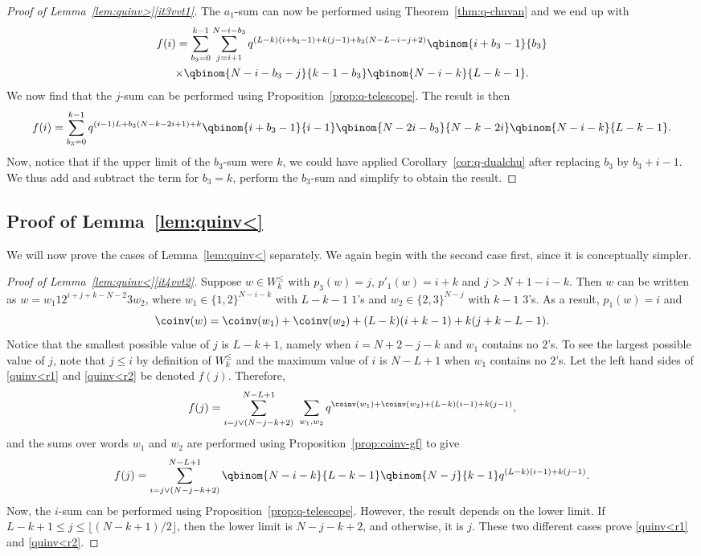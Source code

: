 \begin{proof}[Proof of Lemma~\ref{lem:quinv>}\ref{it3vvt1}]
The $a_1$-sum can now be performed using Theorem~\ref{thm:q-chuvan} and we end up with
\begin{multline*}
f(i) = \sum_{b_3 = 0}^{k-1}   \sum_{j=i+1}^{N-i-b_3} q^{(L-k)(i+b_3-1) + k(j-1) + b_3(N-L-i-j+2)} \qbinom{i+b_3-1}{b_3} \\
\times \qbinom {N-i-b_3-j}{k-1-b_3}  \qbinom {N-i-k}{L-k-1} .
\end{multline*}
We now find that the $j$-sum can be performed using Proposition~\ref{prop:q-telescope}.  The result is then
\[
f(i) = \sum_{b_3 = 0}^{k-1}  q^{(i-1)L + b_3(N-k-2i+1) + k} 
\qbinom{i+b_3-1}{i-1} \qbinom {N-2i-b_3}{N-k-2i} 
\qbinom {N-i-k}{L-k-1} .
\]
Now, notice that if the upper limit of the $b_3$-sum were $k$, we could have applied
Corollary~\ref{cor:q-dualchu} after replacing $b_3$ by $b_3+i-1$.  We thus add and subtract 
the term for $b_3 = k$, perform the $b_3$-sum and simplify to obtain the result.
\end{proof}



\subsection{Proof of Lemma~\ref{lem:quinv<}}
We will now prove the cases of Lemma~\ref{lem:quinv<} separately.
We again begin with the second case first, since it is conceptually simpler.


\begin{proof}[Proof of Lemma~\ref{lem:quinv<}\ref{it4vvt2}]
Suppose $w \in  W_k^\leq$ with $p_3(w) = j$, $p'_1(w) = i+k$ and $j > N+1 - i-k$. Then
$w$ can be written as $w = w_1 1 2^{i+j+k-N-2} 3 w_2$, where $w_1 \in \{1,2\}^{N-i-k}$ with $L-k-1$ $1$'s
and $w_2 \in \{2,3\}^{N-j}$ with $k-1$ $3$'s. As a result, $p_1(w) = i$ and
\[
\coinv(w) = \coinv(w_1) + \coinv(w_2) + (L-k)(i+k-1) + k(j+k-L-1).
\]
Notice that the smallest possible value of $j$ is $L-k+1$, namely when $i = N+2-j-k$ and $w_1$ contains no $2$'s. To see the  largest possible value of $j$,  note that $j \leq i$ by definition of $W_k^\leq$ and the maximum value of $i$ is $N-L+1$ when $w_1$ contains no $2$'s. Let the left hand sides of \eqref{quinv<r1} and \eqref{quinv<r2} be denoted $f(j)$.
Therefore,
\[
f(j) = \sum_{i=j \vee (N-j-k+2)}^{N-L+1}\ \sum_{w_1,w_2} q^{\coinv(w_1) + \coinv(w_2) + (L-k)(i-1) + k(j-1)},
\]
and the sums over words $w_1$ and $w_2$ are performed using Proposition~\ref{prop:coinv-gf} to give
\[
f(j) = \sum_{i=j \vee (N-j-k+2)}^{N-L+1} \qbinom {N-i-k}{L-k-1} \qbinom{N-j}{k-1} q^{ (L-k)(i-1) + k(j-1)}.
\]
Now, the $i$-sum can be performed using Proposition~\ref{prop:q-telescope}. However, the result depends on 
the lower limit. If $L-k+1 \leq j \leq \lfloor (N-k+1)/2 \rfloor$, then the lower limit is $N-j-k+2$, and otherwise,
it is $j$. These two different cases prove \eqref{quinv<r1} and \eqref{quinv<r2}.
\end{proof}

